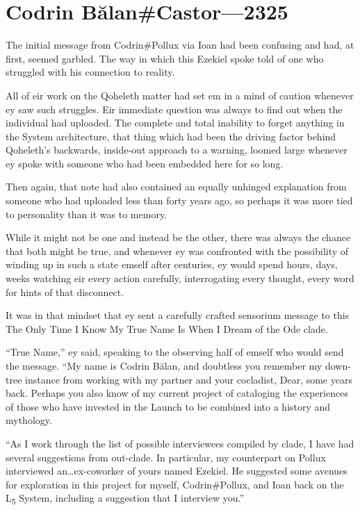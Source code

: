 \hypertarget{codrin-bux103lancastor-2325}{%
\chapter{Codrin Bălan\#Castor—2325}\label{codrin-bux103lancastor-2325}}

The initial message from Codrin\#Pollux via Ioan had been confusing and had, at first, seemed garbled. The way in which this Ezekiel spoke told of one who struggled with his connection to reality.

All of eir work on the Qoheleth matter had set em in a mind of caution whenever ey saw such struggles. Eir immediate question was always to find out when the individual had uploaded. The complete and total inability to forget anything in the System architecture, that thing which had been the driving factor behind Qoheleth's backwards, inside-out approach to a warning, loomed large whenever ey spoke with someone who had been embedded here for so long.

Then again, that note had also contained an equally unhinged explanation from someone who had uploaded less than forty years ago, so perhaps it was more tied to personality than it was to memory.

While it might not be one and instead be the other, there was always the chance that both might be true, and whenever ey was confronted with the possibility of winding up in such a state emself after centuries, ey would spend hours, days, weeks watching eir every action carefully, interrogating every thought, every word for hints of that disconnect.

It was in that mindset that ey sent a carefully crafted sensorium message to this The Only Time I Know My True Name Is When I Dream of the Ode clade.

``True Name,'' ey said, speaking to the observing half of emself who would send the message. ``My name is Codrin Bălan, and doubtless you remember my down-tree instance from working with my partner and your cocladist, Dear, some years back. Perhaps you also know of my current project of cataloging the experiences of those who have invested in the Launch to be combined into a history and mythology.

``As I work through the list of possible interviewees compiled by clade, I have had several suggestions from out-clade. In particular, my counterpart on Pollux interviewed an\ldots ex-coworker of yours named Ezekiel. He suggested some avenues for exploration in this project for myself, Codrin\#Pollux, and Ioan back on the L\textsubscript{5} System, including a suggestion that I interview you.''

